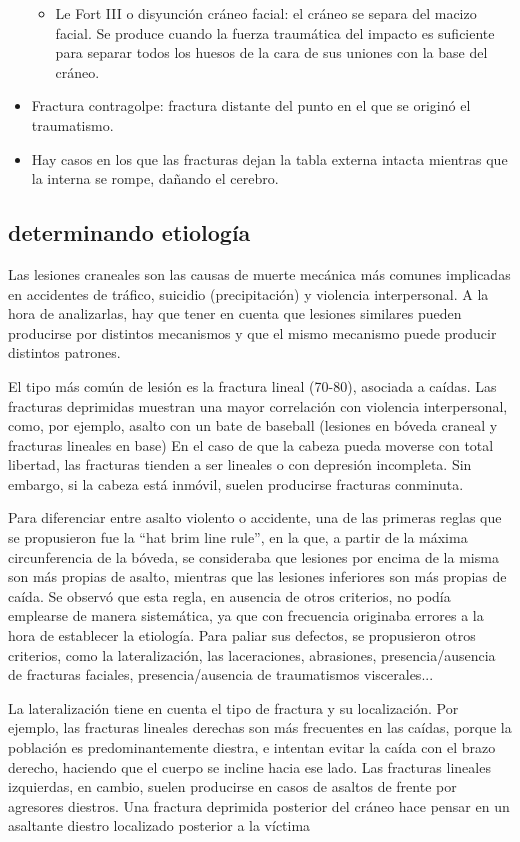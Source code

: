 \begin{itemize}
\begin{itemize}
		\item Le Fort III o disyunción cráneo facial: el cráneo se separa del macizo facial. Se produce cuando la fuerza traumática del impacto es suficiente para separar todos los huesos de la cara de sus uniones con la base del cráneo.
	\end{itemize}
	\item Fractura contragolpe: fractura distante del punto en el que se originó el traumatismo. 
	\item Hay casos en los que las fracturas dejan la tabla externa intacta mientras que la interna se rompe, dañando el cerebro. 
\end{itemize}
\subsection{determinando etiología}
Las lesiones craneales son las causas de muerte mecánica más comunes implicadas en accidentes de tráfico, suicidio (precipitación) y violencia interpersonal. A la hora de analizarlas, hay que tener en cuenta que lesiones similares pueden producirse por distintos mecanismos y que el mismo mecanismo puede producir distintos patrones.
 
El tipo más común de lesión es la fractura lineal (70-80), asociada a caídas. Las fracturas deprimidas muestran una mayor correlación con violencia interpersonal, como, por ejemplo, asalto con un bate de baseball (lesiones en bóveda craneal y fracturas lineales en base)\cite{Kranioti2015}
En el caso de que la cabeza pueda moverse con total libertad, las fracturas tienden a ser lineales o con depresión incompleta. Sin embargo, si la cabeza está inmóvil, suelen producirse fracturas conminuta.\cite{Tong2004}

Para diferenciar entre asalto violento o accidente, una de las primeras reglas que se propusieron fue la “hat brim line rule”, en la que, a partir de la máxima circunferencia de la bóveda, se consideraba que lesiones por encima de la misma son más propias de asalto, mientras que las lesiones inferiores son más propias de caída. Se observó que esta regla, en ausencia de otros criterios, no podía emplearse de manera sistemática, ya que con frecuencia originaba errores a la hora de establecer la etiología. Para paliar sus defectos, se propusieron otros criterios, como la lateralización, las laceraciones, abrasiones, presencia/ausencia de fracturas faciales, presencia/ausencia de traumatismos viscerales...

La lateralización tiene en cuenta el tipo de fractura y su localización. Por ejemplo, las fracturas lineales derechas son más frecuentes en las caídas, porque la población es predominantemente diestra, e intentan evitar la caída con el brazo derecho, haciendo que el cuerpo se incline hacia ese lado. Las fracturas lineales izquierdas, en cambio, suelen producirse en casos de asaltos de frente por agresores diestros. Una fractura deprimida posterior del cráneo hace pensar en un asaltante diestro localizado posterior a la víctima\cite{Kranioti2015}

